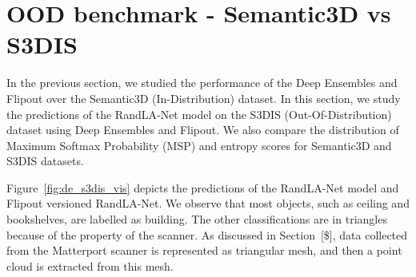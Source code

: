     \section{OOD benchmark - Semantic3D vs S3DIS}
    In the previous section, we studied the performance of the Deep Ensembles and Flipout over the Semantic3D (In-Distribution) dataset.
    In this section, we study the predictions of the RandLA-Net model on the S3DIS (Out-Of-Distribution) dataset using Deep Ensembles and Flipout.
    We also compare the distribution of Maximum Softmax Probability (MSP) and entropy scores for Semantic3D and S3DIS datasets.
    
    Figure~\ref{fig:de_s3dis_vis} depicts the predictions of the RandLA-Net model and Flipout versioned RandLA-Net.
    We observe that most objects, such as ceiling and bookshelves, are labelled as building.
    The other classifications are in triangles because of the property of the scanner.
    As discussed in Section~[\$], data collected from the Matterport scanner is represented as triangular mesh, and then a point cloud is extracted from this mesh.

